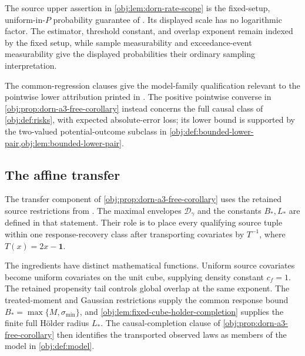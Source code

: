 \documentclass[11pt]{article}
\begin{document}

The source upper assertion in \cref{obj:lem:dorn-rate-scope} is the fixed-setup, uniform-in-\(P\) probability guarantee of \citet[Theorem 1(ii), author PDF p.~12; proof of Theorem 1, pp.~27--28]{Dorn2026GlobalOverlap}. Its displayed scale has no logarithmic factor. The estimator, threshold constant, and overlap exponent remain indexed by the fixed setup, while sample measurability and exceedance-event measurability give the displayed probabilities their ordinary sampling interpretation.

The common-regression clauses give the model-family qualification relevant to the pointwise lower attribution printed in \citet[Theorem 1(i), author PDF p.~12]{Dorn2026GlobalOverlap}. The positive pointwise converse in \cref{obj:prop:dorn-a3-free-corollary} instead concerns the full causal class of \cref{obj:def:risks}, with expected absolute-error loss; its lower bound is supported by the two-valued potential-outcome subclass in \cref{obj:def:bounded-lower-pair,obj:lem:bounded-lower-pair}.

\subsection{The affine transfer}

The transfer component of \cref{obj:prop:dorn-a3-free-corollary} uses the retained source restrictions from \citet[Section 2, Assumptions 1--2, author PDF pp.~3--7]{Dorn2026GlobalOverlap}. The maximal envelopes \(\mathcal D_\gamma\) and the constants \(B_*,L_*\) are defined in that statement. Their role is to place every qualifying source tuple within one response-recovery class after transporting covariates by \(T^{-1}\), where \(T(x)=2x-\mathbf1\).

The ingredients have distinct mathematical functions. Uniform source covariates become uniform covariates on the unit cube, supplying density constant \(c_f=1\). The retained propensity tail controls global overlap at the same exponent. The treated-moment and Gaussian restrictions supply the common response bound \(B_*=\max\{M,\sigma_{\min}\}\), and \cref{obj:lem:fixed-cube-holder-completion} supplies the finite full Hölder radius \(L_*\). The causal-completion clause of \cref{obj:prop:dorn-a3-free-corollary} then identifies the transported observed laws as members of the model in \cref{obj:def:model}.
\end{document}
